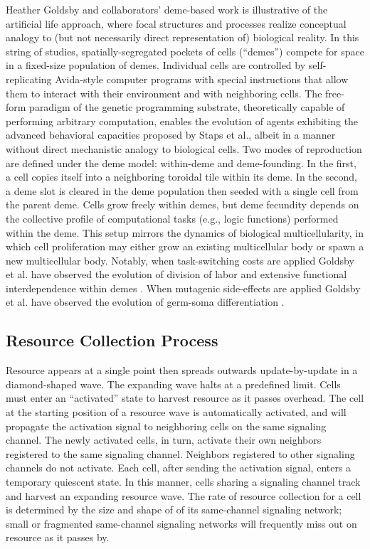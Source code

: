 Heather Goldsby and collaborators' deme-based work is illustrative of the artificial life approach, where focal structures and processes realize conceptual analogy to (but not necessarily direct representation of) biological reality.
In this string of studies, spatially-segregated pockets of cells (``demes'') compete for space in a fixed-size population of demes.
Individual cells are controlled by self-replicating Avida-style computer programs with special instructions that allow them to interact with their environment and with neighboring cells.
The free-form paradigm of the genetic programming substrate, theoretically capable of performing arbitrary computation, enables the evolution of agents exhibiting the advanced behavioral capacities proposed by Staps et al., albeit in a manner without direct mechanistic analogy to biological cells.
Two modes of reproduction are defined under the deme model: within-deme and deme-founding.
In the first, a cell copies itself into a neighboring toroidal tile within its deme.
In the second, a deme slot is cleared in the deme population then seeded with a single cell from the parent deme.
Cells grow freely within demes, but deme fecundity depends on the collective profile of computational tasks (e.g., logic functions) performed within the deme.
This setup mirrors the dynamics of biological multicellularity, in which cell proliferation may either grow an existing multicellular body or spawn a new multicellular body.
Notably, when task-switching costs are applied Goldsby et al. have observed the evolution of division of labor and extensive functional interdependence within demes \citep{goldsby2012task}.
When mutagenic side-effects are applied Goldsby et al. have observed the evolution of germ-soma differentiation \citep{goldsby2014evolutionary}.

\subsection{Resource Collection Process} \label{sup:resource_collection_process}

Resource appears at a single point then spreads outwards update-by-update in a diamond-shaped wave. The expanding wave halts at a predefined limit.
Cells must enter an ``activated'' state to harvest resource as it passes overhead.
The cell at the starting position of a resource wave is automatically activated, and will propagate the activation signal to neighboring cells on the same signaling channel.
The newly activated cells, in turn, activate their own neighbors registered to the same signaling channel.
Neighbors registered to other signaling channels do not activate.
Each cell, after sending the activation signal, enters a temporary quiescent state.
In this manner, cells sharing a signaling channel track and harvest an expanding resource wave.
The rate of resource collection for a cell is determined by the size and shape of of its same-channel signaling network;
small or fragmented same-channel signaling networks will frequently miss out on resource as it passes by.

